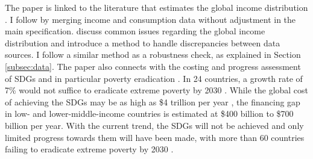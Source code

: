 The paper is linked to the literature that estimates the global income distribution \citep{pinkovskiy_parametric_2009,anand_chapter_2015,lahoti_global_2016,lakner_global_2016,gradin_trends_2021,jorda_global_2019,alvaredo_methods_2021,milanovic_three_2024}. 
I follow \cite{lakner_global_2016} by merging income and consumption data without adjustment in the main specification. 
\cite{anand_chapter_2015} discuss common issues regarding the global income distribution and introduce a method to handle discrepancies between data sources. I follow a similar method as a robustness check, as explained in Section \ref{subsec:data}. 
The paper also connects with the costing and progress assessment of SDGs and in particular poverty eradication \citep{schmidt-traub_investment_2015,rozenberg_beyond_2019,sdsn_sdg_2019,manuel_financing_2020,vorisek_understanding_2020,unctad_estimating_2021,un_sustainable_2022}. In 24 countries, a growth rate of 7\% would not suffice to eradicate extreme poverty by 2030 \citep{unctad_estimating_2021}. While the global cost of achieving the SDGs may be as high as \$4 trillion per year \citep{unctad_world_2023}, %
the financing gap in low- and lower-middle-income countries is estimated at \$400 billion \citep{sdsn_sdg_2019} %
to \$700 billion \citep{kharas_building_2019} %
per year. With the current trend, the SDGs will not be achieved and only limited progress towards them will have been made, with more than 60 countries failing to eradicate extreme poverty by 2030 \citep{moyer_are_2020}. %
